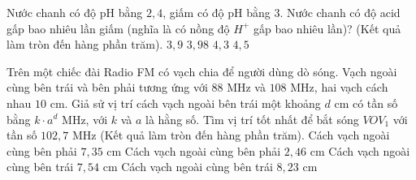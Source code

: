 \begin{ex}%
	 Nước chanh có độ pH bằng $2{,}4$, giấm có độ pH bằng $3$. Nước chanh có độ acid gấp bao nhiêu lần giấm (nghĩa là có nồng độ $H^+$ gấp bao nhiêu lần)? (Kết quả làm tròn đến hàng phần trăm).
	 \choice
		 { $3{,}9$ }
		{ \True $3{,}98$  }
		{  $4{,}3$ }
		{ $4{,}5$ } 
\end{ex}

\begin{ex}%
	Trên một chiếc đài Radio FM có vạch chia để người dùng dò sóng. Vạch  ngoài cùng bên trái và bên phải tương ứng với $88$ MHz và $108$ MHz, hai vạch cách nhau $10$ cm. Giả sử vị trí cách vạch ngoài bên trái một khoảng $d$ cm có tần số bằng $k\cdot a^d$ MHz, với $k$ và $a$ là hằng số. Tìm vị trí tốt nhất để bắt sóng $VOV_1$ với tần số $102{,}7\text{ MHz}$ (Kết quả làm tròn đến hàng phần trăm).
	 \choice
		{ Cách vạch ngoài  cùng bên phải $7{,}35$ cm }
		{ Cách vạch ngoài cùng bên phải  $2{,}46$ cm }
		{ \True Cách vạch ngoài cùng bên trái $7{,}54$  cm }
		 { Cách vạch ngoài cùng bên trái $8{,}23$ cm }
\end{ex}



